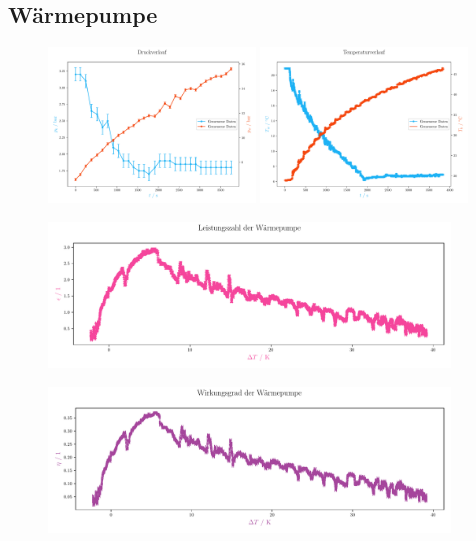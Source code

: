 \documentclass[12pt,english,ngerman]{scrartcl}
\begin{document}
\subsection{Wärmepumpe}

\begin{figure}[H]
	\centering
	\includegraphics[width=0.49\textwidth]{figures/pressureProfile.pdf}
	\includegraphics[width=0.49\textwidth]{figures/temperatureProfile.pdf}
	\caption{}\label{fig:druckTemperaturVerlauf}
\end{figure}

\begin{figure}[H]
	\centering
	\includegraphics[width=0.95\textwidth]{figures/leistungszahlVerlauf.pdf}
	\caption{}\label{fig:leistungszahlVerlauf}
\end{figure}

\begin{figure}[H]
	\centering
	\includegraphics[width=0.95\textwidth]{figures/wirkungsgradVerlauf.pdf}
	\caption{}\label{fig:wirkungsgradVerlauf}
\end{figure}
\end{document}
